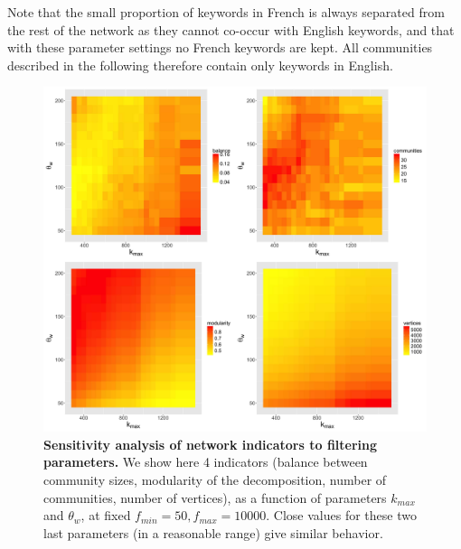 Note that the small proportion of keywords in French is always separated from the rest of the network as they cannot co-occur with English keywords, and that with these parameter settings no French keywords are kept. All communities described in the following therefore contain only keywords in English.




\begin{figure}
\centering
\includegraphics[width=\linewidth]{figures/Fig6.jpg}
\caption{\textbf{Sensitivity analysis of network indicators to filtering parameters.} We show here 4 indicators (balance between community sizes, modularity of the decomposition, number of communities, number of vertices), as a function of parameters $k_{max}$ and $\theta_w$, at fixed $f_{min} = 50, f_{max} = 10000$. Close values for these two last parameters (in a reasonable range) give similar behavior.}
\label{fig:sensitivity}
\end{figure}





